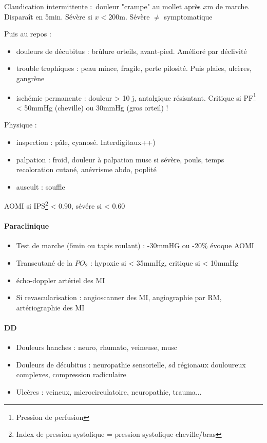 \documentclass{article}
\begin{document}
Claudication intermittente : douleur "crampe" au mollet après $x$m de marche.
Disparaît en 5min. Sévère si $x < 200$m. \danger{} Sévère $\neq$ symptomatique

Puis au repos : 
\begin{itemize}
  \item douleurs de décubitus : brûlure orteils, avant-pied. Amélioré par
    déclivité
  \item trouble trophiques : peau mince, fragile, perte pilosité. Puis plaies,
    ulcères, gangrène
  \item ischémie permanente : douleur > 10 j, antalgique résisntant. Critique si
    PF\footnote{Pression de perfusion} < 50mmHg (cheville) ou 30mmHg (gros
    orteil) !
\end{itemize}
Physique : 
\begin{itemize}
  \item inspection : pâle, cyanosé. Interdigitaux++)
  \item palpation : froid, douleur à palpation musc si sévère, pouls, temps recoloration cutané, anévrisme
abdo, poplité
  \item auscult : souffle
\end{itemize}
AOMI si IPS\footnote{Index de pression systolique = pression systolique
cheville/bras} < 0.90, sévére si < 0.60

\paragraph{Paraclinique}
\begin{itemize}
  \item Test de marche (6min ou tapis roulant) : -30mmHG ou -20\% évoque AOMI
  \item Transcutané de la $PO_2$ : hypoxie si < 35mmHg, critique si < 10mmHg
  \item écho-doppler artériel des MI
  \item Si revascularisation : angioscanner des MI, angiographie par RM,
    artériographie des MI
\end{itemize}

\paragraph{DD} 
\begin{itemize}
  \item Douleurs hanches : neuro, rhumato, veineuse, musc
  \item Douleurs de décubitus : neuropathie sensorielle, sd régionaux douloureux
    complexes, compression radiculaire
  \item Ulcères : veineux, microcirculatoire, neuropathie, trauma...
\end{itemize}
\end{document}

